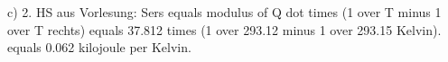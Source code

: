 c) 2. HS aus Vorlesung:
Sers equals modulus of Q dot times (1 over T minus 1 over T rechts) equals 37.812 times (1 over 293.12 minus 1 over 293.15 Kelvin).
equals 0.062 kilojoule per Kelvin.